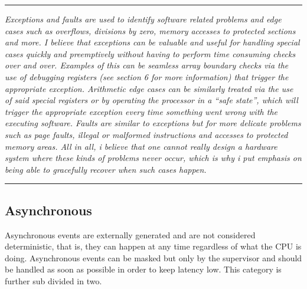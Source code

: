     \par\noindent\rule{\textwidth}{0.4pt}
    \textit{Exceptions and faults are used to identify software related problems and edge cases such as overflows, divisions by zero, memory accesses to protected sections and more. I believe that exceptions can be valuable and useful for handling special cases quickly and preemptively without having to perform time consuming checks over and over. Examples of this can be seamless array boundary checks via the use of debugging registers (see section 6 for more information) that trigger the appropriate exception. Arithmetic edge cases can be similarly treated via the use of said special registers or by operating the processor in a ``safe state'', which will trigger the appropriate exception every time something went wrong with the executing software. Faults are similar to exceptions but for more delicate problems such as page faults, illegal or malformed instructions and accesses to protected memory areas. All in all, i believe that one cannot really design a hardware system where these kinds of problems never occur, which is why i put emphasis on being able to gracefully recover when such cases happen.}
    \par\noindent\rule{\textwidth}{0.4pt}

    \subsection{Asynchronous}

        \vspace{10pt}

        Asynchronous events are externally generated and are not considered deterministic, that is, they can happen at any time regardless of what the CPU is doing. Asynchronous events can be masked but only by the supervisor and should be handled as soon as possible in order to keep latency low. This category is further sub divided in two.

